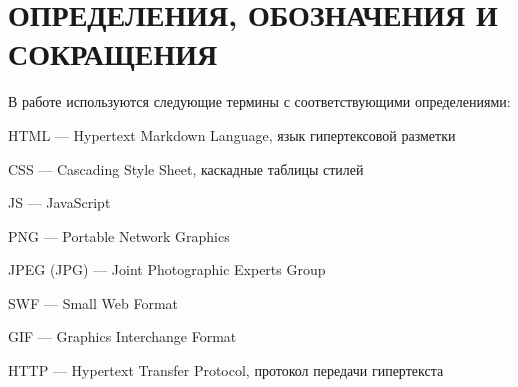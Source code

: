 \section*{\large ОПРЕДЕЛЕНИЯ, ОБОЗНАЧЕНИЯ И СОКРАЩЕНИЯ}

В работе используются следующие термины с соответствующими определениями:

HTML --- Hypertext Markdown Language, язык гипертексовой разметки

CSS --- Cascading Style Sheet, каскадные таблицы стилей

JS --- JavaScript

PNG --- Portable Network Graphics

JPEG (JPG) --- Joint Photographic Experts Group

SWF --- Small Web Format

GIF --- Graphics Interchange Format

HTTP --- Hypertext Transfer Protocol, протокол передачи гипертекста

\pagebreak